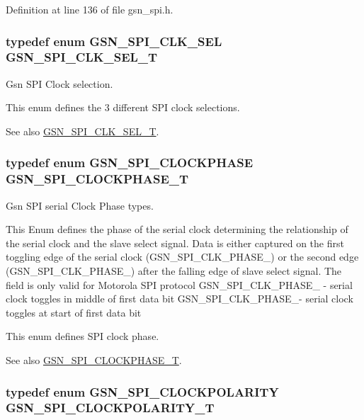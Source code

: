 Definition at line 136 of file gsn\_\-spi.h.

\hypertarget{a00655_gac4a300710a224a1971e5a78eae8eb89e}{
\subsubsection[{GSN\_\-SPI\_\-CLK\_\-SEL\_\-T}]{\setlength{\rightskip}{0pt plus 5cm}typedef enum {\bf GSN\_\-SPI\_\-CLK\_\-SEL} {\bf GSN\_\-SPI\_\-CLK\_\-SEL\_\-T}}}
\label{a00655_gac4a300710a224a1971e5a78eae8eb89e}


Gsn SPI Clock selection. 

This enum defines the 3 different SPI clock selections. \begin{DoxySeeAlso}{See also}
\hyperlink{a00655_gac4a300710a224a1971e5a78eae8eb89e}{GSN\_\-SPI\_\-CLK\_\-SEL\_\-T}. 
\end{DoxySeeAlso}
\hypertarget{a00655_ga1399b803d30956e8ed6f4929033329ad}{
\subsubsection[{GSN\_\-SPI\_\-CLOCKPHASE\_\-T}]{\setlength{\rightskip}{0pt plus 5cm}typedef enum {\bf GSN\_\-SPI\_\-CLOCKPHASE}  {\bf GSN\_\-SPI\_\-CLOCKPHASE\_\-T}}}
\label{a00655_ga1399b803d30956e8ed6f4929033329ad}


Gsn SPI serial Clock Phase types. 

This Enum defines the phase of the serial clock determining the relationship of the serial clock and the slave select signal. Data is either captured on the first toggling edge of the serial clock (GSN\_\-SPI\_\-CLK\_\-PHASE\_) or the second edge (GSN\_\-SPI\_\-CLK\_\-PHASE\_) after the falling edge of slave select signal. The field is only valid for Motorola SPI protocol GSN\_\-SPI\_\-CLK\_\-PHASE\_ -\/ serial clock toggles in middle of first data bit GSN\_\-SPI\_\-CLK\_\-PHASE\_-\/ serial clock toggles at start of first data bit

This enum defines SPI clock phase. \begin{DoxySeeAlso}{See also}
\hyperlink{a00655_ga1399b803d30956e8ed6f4929033329ad}{GSN\_\-SPI\_\-CLOCKPHASE\_\-T}. 
\end{DoxySeeAlso}
\hypertarget{a00655_ga40c914db809ec79fd3a564dda8364aea}{
\subsubsection[{GSN\_\-SPI\_\-CLOCKPOLARITY\_\-T}]{\setlength{\rightskip}{0pt plus 5cm}typedef enum {\bf GSN\_\-SPI\_\-CLOCKPOLARITY}  {\bf GSN\_\-SPI\_\-CLOCKPOLARITY\_\-T}}}
\label{a00655_ga40c914db809ec79fd3a564dda8364aea}


